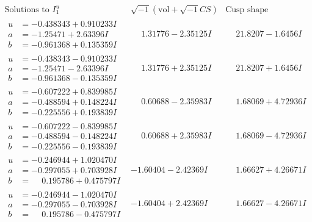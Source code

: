 \documentclass[1p]{elsarticle_modified}
\theoremstyle{definition}
\newcommand{\I}{\sqrt{-1}}
\begin{document}
$$\begin{array}{c|c|c}  
\text{Solutions to }I^u_{1}& \I (\text{vol} + \sqrt{-1}CS) & \text{Cusp shape}\\
 \hline 
\begin{aligned}
u &= -0.438343 + 0.910233 I \\
a &= -1.25471 + 2.63396 I \\
b &= -0.961368 + 0.135359 I\end{aligned}
 & \phantom{-}1.31776 - 2.35125 I & \phantom{-}21.8207 - 1.6456 I \\ \hline\begin{aligned}
u &= -0.438343 - 0.910233 I \\
a &= -1.25471 - 2.63396 I \\
b &= -0.961368 - 0.135359 I\end{aligned}
 & \phantom{-}1.31776 + 2.35125 I & \phantom{-}21.8207 + 1.6456 I \\ \hline\begin{aligned}
u &= -0.607222 + 0.839985 I \\
a &= -0.488594 + 0.148224 I \\
b &= -0.225556 + 0.193839 I\end{aligned}
 & \phantom{-}0.60688 - 2.35983 I & \phantom{-}1.68069 + 4.72936 I \\ \hline\begin{aligned}
u &= -0.607222 - 0.839985 I \\
a &= -0.488594 - 0.148224 I \\
b &= -0.225556 - 0.193839 I\end{aligned}
 & \phantom{-}0.60688 + 2.35983 I & \phantom{-}1.68069 - 4.72936 I \\ \hline\begin{aligned}
u &= -0.246944 + 1.020470 I \\
a &= -0.297055 + 0.703928 I \\
b &= \phantom{-}0.195786 + 0.475797 I\end{aligned}
 & -1.60404 - 2.42369 I & \phantom{-}1.66627 + 4.26671 I \\ \hline\begin{aligned}
u &= -0.246944 - 1.020470 I \\
a &= -0.297055 - 0.703928 I \\
b &= \phantom{-}0.195786 - 0.475797 I\end{aligned}
 & -1.60404 + 2.42369 I & \phantom{-}1.66627 - 4.26671 I \\ \hline\begin{aligned}

\end{aligned}
\end{array}$$
\end{document}
